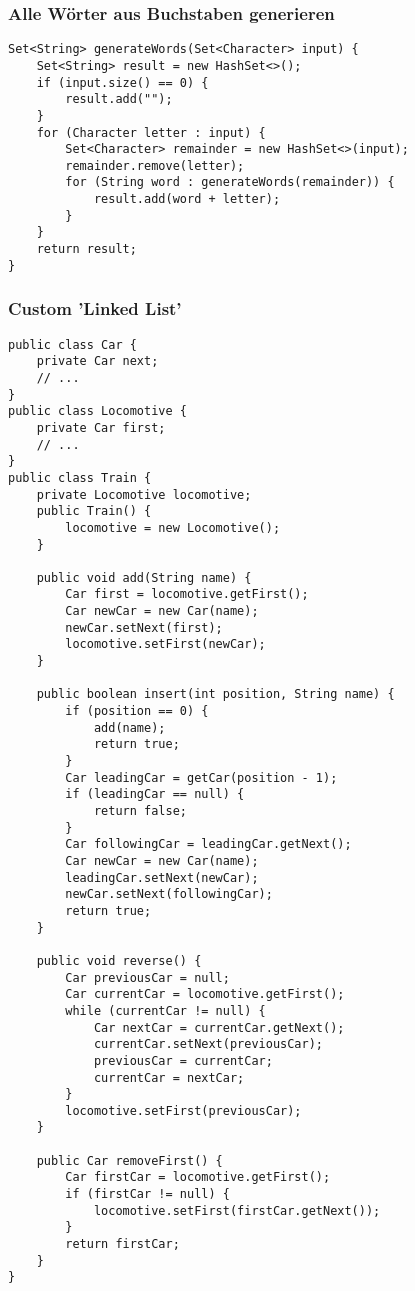 \begin{multicols*}{5}
	\subsubsection{Alle Wörter aus Buchstaben generieren}
		\begin{lstlisting}
Set<String> generateWords(Set<Character> input) { 
	Set<String> result = new HashSet<>();
	if (input.size() == 0) { 
		result.add(""); 
	}
	for (Character letter : input) {
		Set<Character> remainder = new HashSet<>(input); 
		remainder.remove(letter);
		for (String word : generateWords(remainder)) {
			result.add(word + letter);
		}
	}
	return result;
}
		\end{lstlisting}
	
	\subsubsection{Custom 'Linked List'}
	\begin{lstlisting}
public class Car {
	private Car next;
	// ...
}
public class Locomotive {
	private Car first;
	// ...
}
public class Train {
	private Locomotive locomotive;
	public Train() {
		locomotive = new Locomotive();
	}
	
	public void add(String name) {
		Car first = locomotive.getFirst();
		Car newCar = new Car(name);
		newCar.setNext(first);
		locomotive.setFirst(newCar);
	}
	
	public boolean insert(int position, String name) {
		if (position == 0) {
			add(name);
			return true;
		}
		Car leadingCar = getCar(position - 1);
		if (leadingCar == null) {
			return false;
		}
		Car followingCar = leadingCar.getNext();
		Car newCar = new Car(name);
		leadingCar.setNext(newCar);
		newCar.setNext(followingCar);
		return true;
	}
	
	public void reverse() {
		Car previousCar = null;
		Car currentCar = locomotive.getFirst();
		while (currentCar != null) {
			Car nextCar = currentCar.getNext();
			currentCar.setNext(previousCar);
			previousCar = currentCar;
			currentCar = nextCar;
		}
		locomotive.setFirst(previousCar);
	}
	
	public Car removeFirst() {
		Car firstCar = locomotive.getFirst();
		if (firstCar != null) {
			locomotive.setFirst(firstCar.getNext());
		}
		return firstCar;
	}
}
	\end{lstlisting}
	

\end{multicols*}

% 

